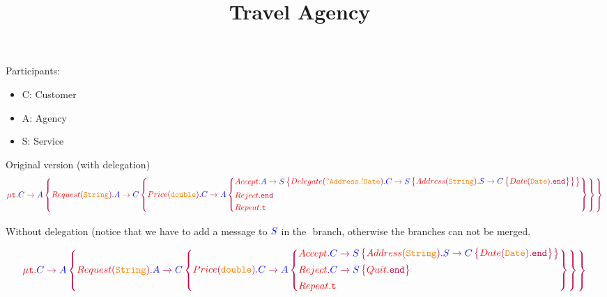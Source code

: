 \documentclass{article}
\title{Travel Agency~\cite{HuSessionBased2008}}
\date{}
\begin{document}
	\maketitle

	Participants:
	\begin{itemize}
		\item C: Customer
		\item A: Agency
		\item S: Service
	\end{itemize}

Original version (with delegation)
	$$
	\gtRec{t}{
		\gtComm{C}{A}{
			{{Request}[String]{
					\gtComm{A}{C}{
						{{Price}[double]{
								\gtComm{C}{A}{
									{{Accept}{\gtComm{A}{S}{
												{{Delegate}[?Address.!Date]{
														\gtComm{C}{S}{
															{{Address}[String]{
																	\gtComm{S}{C}{
																	{{Date}[Date]{\gtEnd}}
																}
															}}
														}
												}}
									}}}
									{{Reject}{\gtEnd}}
									{{Repeat}{\gtVar{t}}}
								}
						}}
					}
			}}
		}
	}
	$$

Without delegation (notice that we have to add a message to ${\color{blue} S}$
in the $\label{Reject}$ branch, otherwise the branches can not be merged.

	$$
\gtRec{t}{
	\gtComm{C}{A}{
		{{Request}[String]{
				\gtComm{A}{C}{
					{{Price}[double]{
							\gtComm{C}{A}{
								{{Accept}{
										\gtComm{C}{S}{
											{{Address}[String]{
													\gtComm{S}{C}{
														{{Date}[Date]{\gtEnd}}
													}
											}}
										}
									}}
								{{Reject}{\gtComm{C}{S}{
											{{Quit}{\gtEnd}}
								}}}
								{{Repeat}{\gtVar{t}}}
							}
					}}
				}
		}}
	}
}
$$

	
	
\end{document}
